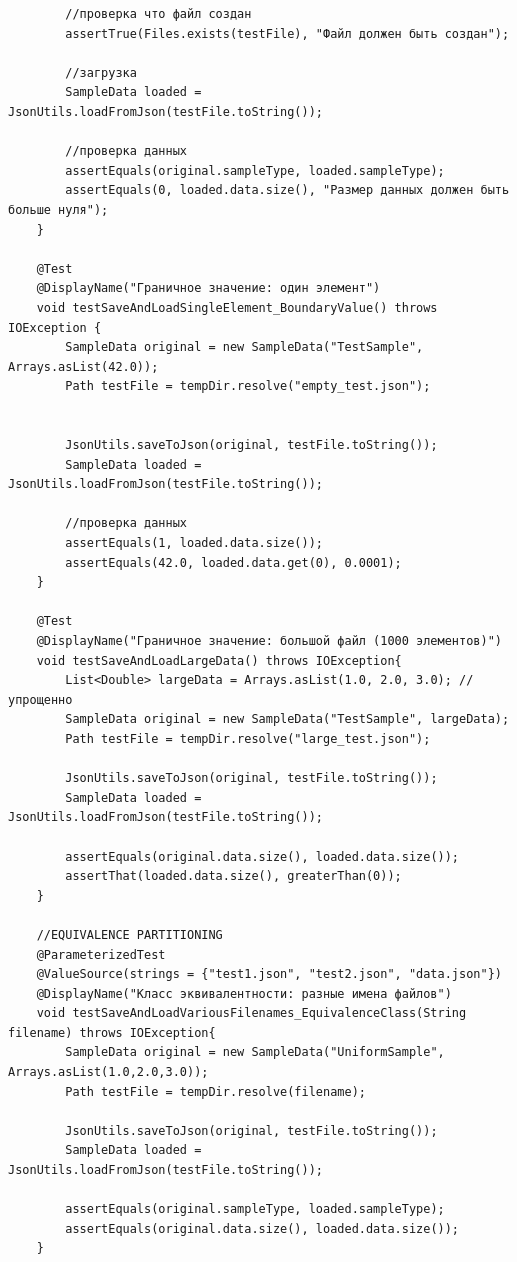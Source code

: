 \begin{verbatim}
        //проверка что файл создан
        assertTrue(Files.exists(testFile), "Файл должен быть создан");

        //загрузка
        SampleData loaded = JsonUtils.loadFromJson(testFile.toString());

        //проверка данных
        assertEquals(original.sampleType, loaded.sampleType);
        assertEquals(0, loaded.data.size(), "Размер данных должен быть больше нуля");
    }

    @Test
    @DisplayName("Граничное значение: один элемент")
    void testSaveAndLoadSingleElement_BoundaryValue() throws IOException {
        SampleData original = new SampleData("TestSample", Arrays.asList(42.0));
        Path testFile = tempDir.resolve("empty_test.json");


        JsonUtils.saveToJson(original, testFile.toString());
        SampleData loaded = JsonUtils.loadFromJson(testFile.toString());

        //проверка данных
        assertEquals(1, loaded.data.size());
        assertEquals(42.0, loaded.data.get(0), 0.0001);
    }

    @Test
    @DisplayName("Граничное значение: большой файл (1000 элементов)")
    void testSaveAndLoadLargeData() throws IOException{
        List<Double> largeData = Arrays.asList(1.0, 2.0, 3.0); //упрощенно
        SampleData original = new SampleData("TestSample", largeData);
        Path testFile = tempDir.resolve("large_test.json");

        JsonUtils.saveToJson(original, testFile.toString());
        SampleData loaded = JsonUtils.loadFromJson(testFile.toString());

        assertEquals(original.data.size(), loaded.data.size());
        assertThat(loaded.data.size(), greaterThan(0));
    }

    //EQUIVALENCE PARTITIONING
    @ParameterizedTest
    @ValueSource(strings = {"test1.json", "test2.json", "data.json"})
    @DisplayName("Класс эквивалентности: разные имена файлов")
    void testSaveAndLoadVariousFilenames_EquivalenceClass(String filename) throws IOException{
        SampleData original = new SampleData("UniformSample", Arrays.asList(1.0,2.0,3.0));
        Path testFile = tempDir.resolve(filename);

        JsonUtils.saveToJson(original, testFile.toString());
        SampleData loaded = JsonUtils.loadFromJson(testFile.toString());

        assertEquals(original.sampleType, loaded.sampleType);
        assertEquals(original.data.size(), loaded.data.size());
    }


\end{verbatim}
